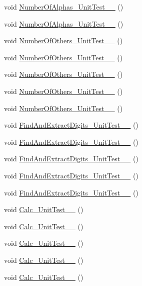 \begin{DoxyCompactItemize}
void \hyperlink{class_unit_test_1_1_functions___unit_test_a8f0fdb9b4a5d070d3097a2f432036408}{Number\+Of\+Alphas\+\_\+\+Unit\+Test\+\_\+\_} ()
\item 
void \hyperlink{class_unit_test_1_1_functions___unit_test_a2f0df7b8d5dc298629a4444a55192909}{Number\+Of\+Alphas\+\_\+\+Unit\+Test\+\_\+\_} ()
\item 
void \hyperlink{class_unit_test_1_1_functions___unit_test_adefb58b36c1d73931901d2ea819ef9bb}{Number\+Of\+Others\+\_\+\+Unit\+Test\+\_\+\_} ()
\item 
void \hyperlink{class_unit_test_1_1_functions___unit_test_a9ee8e71690c6b67d3f46c2edf23acbb1}{Number\+Of\+Others\+\_\+\+Unit\+Test\+\_\+\_} ()
\item 
void \hyperlink{class_unit_test_1_1_functions___unit_test_a6cd3d336d1a62bdb427ab85732ec2195}{Number\+Of\+Others\+\_\+\+Unit\+Test\+\_\+\_} ()
\item 
void \hyperlink{class_unit_test_1_1_functions___unit_test_af8acdf0c7b02333f178257b35ea2470a}{Number\+Of\+Others\+\_\+\+Unit\+Test\+\_\+\_} ()
\item 
void \hyperlink{class_unit_test_1_1_functions___unit_test_a958c914a2f12e4a7afcac7e9853c5d8a}{Number\+Of\+Others\+\_\+\+Unit\+Test\+\_\+\_} ()
\item 
void \hyperlink{class_unit_test_1_1_functions___unit_test_af46f621533e27cab184fed323849d78c}{Find\+And\+Extract\+Digits\+\_\+\+Unit\+Test\+\_\+\_} ()
\item 
void \hyperlink{class_unit_test_1_1_functions___unit_test_ab5364410a453ee32ba39cb2e7fb33ad8}{Find\+And\+Extract\+Digits\+\_\+\+Unit\+Test\+\_\+\_} ()
\item 
void \hyperlink{class_unit_test_1_1_functions___unit_test_a8929d31e9c8b7b35bbe99e82afbe81f0}{Find\+And\+Extract\+Digits\+\_\+\+Unit\+Test\+\_\+\_} ()
\item 
void \hyperlink{class_unit_test_1_1_functions___unit_test_a6916a33c2f18f9b0294ab711bb6a9007}{Find\+And\+Extract\+Digits\+\_\+\+Unit\+Test\+\_\+\_} ()
\item 
void \hyperlink{class_unit_test_1_1_functions___unit_test_aa7521c5326b71ad5145a593e9d0cec71}{Find\+And\+Extract\+Digits\+\_\+\+Unit\+Test\+\_\+\_} ()
\item 
void \hyperlink{class_unit_test_1_1_functions___unit_test_a48e44c668c4c38ff35859f72f57e3c9a}{Calc\+\_\+\+Unit\+Test\+\_\+\_} ()
\item 
void \hyperlink{class_unit_test_1_1_functions___unit_test_a6d41f15fea9671538f4036954ffaac4a}{Calc\+\_\+\+Unit\+Test\+\_\+\_} ()
\item 
void \hyperlink{class_unit_test_1_1_functions___unit_test_ace9c4afc810a47d0036666396f156f88}{Calc\+\_\+\+Unit\+Test\+\_\+\_} ()
\item 
void \hyperlink{class_unit_test_1_1_functions___unit_test_ade75a9bc32e368fe85b6712a2a104f7b}{Calc\+\_\+\+Unit\+Test\+\_\+\_} ()
\item 
void \hyperlink{class_unit_test_1_1_functions___unit_test_a1cad2473fd602208e26066bbd9a8fad6}{Calc\+\_\+\+Unit\+Test\+\_\+\_} ()
\end{DoxyCompactItemize}



